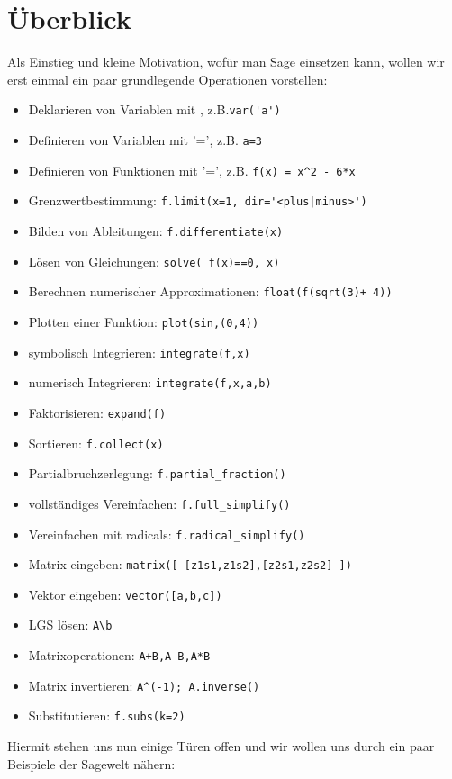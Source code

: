 \documentclass[fontsize=12pt,paper=a4,twoside,bibtotoc,idxtotoc,
liststotoc,pagesize,BCOR1.2cm,DIV15,chapterprefix,pagesize=pdftex]{scrbook}
\theoremstyle{plain}
\theoremstyle{definition}
\theoremstyle{remark}
\begin{document}
\section{Überblick}

Als Einstieg und kleine Motivation, wofür man Sage einsetzen kann, wollen wir erst einmal ein paar grundlegende Operationen 
vorstellen:
\begin{itemize}
 \item Deklarieren von Variablen mit , z.B.{\verb~var('a')~} 
 \item Definieren von Variablen mit {\color{blue}'='}, z.B. {\verb~a=3~} 
 \item Definieren von Funktionen mit{\color{blue} '='}, z.B. {\verb~f(x) = x^2 - 6*x~}
 \item Grenzwertbestimmung: {\color{blue}   \verb~f.limit(x=1, dir='<plus|minus>')~}
 \item Bilden von Ableitungen: {\color{blue} \verb~f.differentiate(x)~}
 \item Lösen von Gleichungen: {\color{blue} \verb~solve( f(x)==0, x)~}
 \item Berechnen numerischer Approximationen: {\color{blue} \verb~float(f(sqrt(3)+ 4))~}
 \item Plotten einer Funktion: {\color{blue} \verb~plot(sin,(0,4))~}
 \item symbolisch Integrieren: {\color{blue} \verb~integrate(f,x)~}
 \item numerisch Integrieren: {\color{blue} \verb~integrate(f,x,a,b)~}
 \item Faktorisieren: {\color{blue} \verb~expand(f)~}
 \item Sortieren: {\color{blue} \verb~f.collect(x)~}
 \item Partialbruchzerlegung: {\color{blue} \verb~f.partial_fraction()~}
 \item vollständiges Vereinfachen: {\color{blue} \verb~f.full_simplify()~}
 \item Vereinfachen mit radicals: {\color{blue} \verb~f.radical_simplify()~}
 \item Matrix eingeben: {\color{blue} \verb~matrix([ [z1s1,z1s2],[z2s1,z2s2] ])~}
 \item Vektor eingeben: {\color{blue} \verb~vector([a,b,c])~}
 \item LGS lösen: {\color{blue} \verb~A\b~}
 \item Matrixoperationen: {\color{blue} \verb~A+B,A-B,A*B~}
 \item Matrix invertieren: {\color{blue} \verb~A^(-1); A.inverse()~}
 \item Substitutieren: {\color{blue} \verb~f.subs(k=2)~}
\end{itemize}
Hiermit stehen uns nun einige Türen offen und wir wollen uns durch ein paar Beispiele der Sagewelt nähern:
\end{document}
